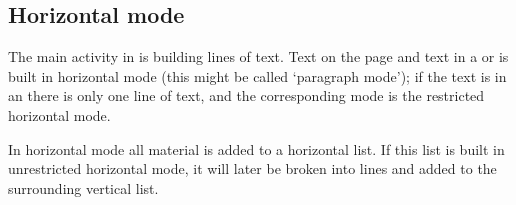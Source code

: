 \documentclass[twoside,letterpaper,openright]{rapport3}
\begin{document}
\subsection{Horizontal mode}

The main activity in  is building lines of text.
Text on the page and text in a  or  is built in
horizontal mode (this might be called `paragraph mode');
if the text is in an  there is only one line
of text, and the corresponding mode is the restricted
horizontal mode.

In horizontal mode all material is added to a horizontal list.
If this list is built in unrestricted horizontal mode, it
will later be broken into lines and added to the surrounding vertical list.
\end{document}
